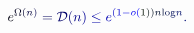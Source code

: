 \documentclass[12pt]{article}
\begin{document}
\makeatletter
\renewcommand*{\@textcolor}[3]{%
  \protect\leavevmode
  \begingroup
    \color#1{#2}#3%
  \endgroup
}
\makeatother
\begin{displaymath}
\mathcolor[RGB]{0,0,15}{e} ^ { \mathcolor[RGB]{0,0,30}{\Omega} \mathcolor[RGB]{0,0,45}{(} \mathcolor[RGB]{0,0,60}{n} \mathcolor[RGB]{0,0,75}{)} } \mathcolor[RGB]{0,0,90}{=} \mathcal { \mathcolor[RGB]{0,0,105}{D} } \mathcolor[RGB]{0,0,120}{(} \mathcolor[RGB]{0,0,135}{n} \mathcolor[RGB]{0,0,150}{)} \mathcolor[RGB]{0,0,165}{\leq} \mathcolor[RGB]{0,0,180}{e} ^ { \mathcolor[RGB]{0,0,195}{\left(} \mathcolor[RGB]{0,0,210}{1} \mathcolor[RGB]{0,0,225}{-} \mathcolor[RGB]{0,0,240}{o} \mathcolor[RGB]{0,0,255}{(} \mathcolor[RGB]{0,15,0}{1} \mathcolor[RGB]{0,15,15}{)} \mathcolor[RGB]{0,15,30}{\right)} \mathcolor[RGB]{0,15,45}{n} \mathrm { \mathcolor[RGB]{0,15,60}{l} \mathcolor[RGB]{0,15,75}{o} \mathcolor[RGB]{0,15,90}{g} } \mathcolor[RGB]{0,15,105}{n} } \mathcolor[RGB]{0,15,120}{.}
\end{displaymath}
\end{document}

